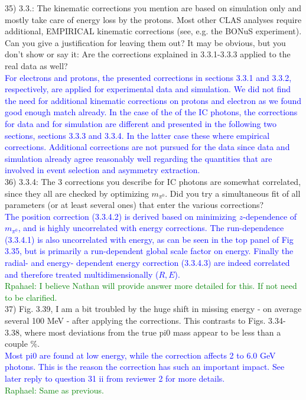35) 3.3.: The kinematic corrections you mention are based on simulation only and 
mostly take care of energy loss by the protons. Most other CLAS analyses 
require additional, EMPIRICAL kinematic corrections (see, e.g. the BONuS 
experiment). Can you give a justification for leaving them out?
It may be obvious, but you don't show or say it: Are the corrections explained 
in 3.3.1-3.3.3 applied to the real data as well?\\
\textcolor{blue}{For electrons and protons, the presented corrections in 
sections 3.3.1 and 3.3.2, respectively, are applied for experimental data and 
simulation. We did not find the need for additional kinematic corrections on 
protons and electron as we found good enough match already.
In the case of the of the IC photons, the corrections 
for data and for simulation are different and presented in the following two 
sections, sections 3.3.3 and 3.3.4. In the latter case
these where empirical corrections.  Additional corrections are not pursued
for the data since data and simulation already agree reasonably well regarding
the quantities that are involved in event selection and asymmetry 
extraction.}\\

36) 3.3.4: The 3 corrections you describe for IC photons are somewhat 
correlated, since they all are checked by optimizing $m_{\pi^0}$. Did you try a 
simultaneous fit of all parameters (or at least several ones) that enter the 
various corrections?\\
\textcolor{blue}{The position correction (3.3.4.2) is derived based on minimizing
$z$-dependence of $m_{\pi^0}$, and is highly uncorrelated with energy 
corrections. The run-dependence (3.3.4.1) is also uncorrelated with energy, as
can be seen in the top panel of Fig 3.35, but is primarily a run-dependent global
scale factor on energy. Finally the radial- and energy- dependent energy correction
(3.3.4.3) are indeed correlated and therefore treated multidimensionally ($R,E$).}\\
\textcolor{green}{Rpahael: I believe Nathan will provide answer more detailed 
for this.  If not need to be clarified.} \\


37) Fig. 3.39, I am a bit troubled by the huge shift in missing energy - on 
average several 100 MeV - after applying the corrections. This contrasts to  
Figs. 3.34-3.38, where most deviations from the true pi0 mass appear to be less  
than a couple $\%$.\\
\textcolor{blue}{Most pi0 are found at low energy, while the correction affects
2 to 6.0 GeV photons. This is the reason the correction has such an important 
impact. See later reply to question 31 ii from reviewer 2 for more details.}\\
\textcolor{green}{Raphael: Same as previous.} \\

